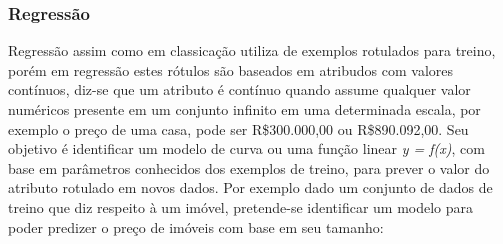 \subsubsection{Regressão}
\label{subsubsec{regressao}}
Regressão assim como em classicação utiliza de exemplos rotulados para treino, porém em regressão estes rótulos são baseados em atribudos com valores contínuos, 
diz-se que um atributo é contínuo quando assume qualquer valor numéricos presente em um conjunto infinito em uma determinada escala, por exemplo o preço de uma casa, 
pode ser R\$300.000,00 ou R\$890.092,00. Seu objetivo é identificar um modelo de curva ou uma função linear \textit{y = f(x)}, com base
em parâmetros conhecidos dos exemplos de treino, para prever o valor do atributo rotulado em novos dados.
Por exemplo dado um conjunto de dados de treino que diz respeito à um imóvel, pretende-se identificar um modelo para poder predizer
o preço de imóveis com base em seu tamanho:

\begin{table}[h!]
\end{table}

